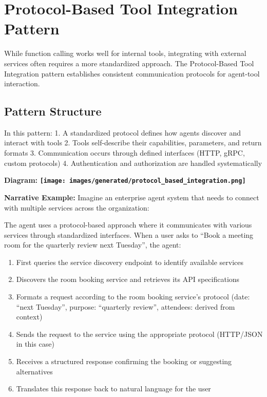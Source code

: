 \documentclass[11pt,oneside]{book}
\providecommand{\pandocbounded}[1]{\textbf{#1}}
\providecommand{\tightlist}{%
  \setlength{\itemsep}{0pt}\setlength{\parskip}{0pt}}
\begin{document}
\section{Protocol-Based Tool Integration
Pattern}\label{protocol-based-tool-integration-pattern}

While function calling works well for internal tools, integrating with
external services often requires a more standardized approach. The
Protocol-Based Tool Integration pattern establishes consistent
communication protocols for agent-tool interaction.

\subsection{Pattern Structure}\label{pattern-structure-2}

In this pattern: 1. A standardized protocol defines how agents discover
and interact with tools 2. Tools self-describe their capabilities,
parameters, and return formats 3. Communication occurs through defined
interfaces (HTTP, gRPC, custom protocols) 4. Authentication and
authorization are handled systematically

\textbf{Diagram:}
\pandocbounded{\texttt{[image: images/generated/protocol\_based\_integration.png]}}

\textbf{Narrative Example:} Imagine an enterprise agent system that
needs to connect with multiple services across the organization:

The agent uses a protocol-based approach where it communicates with
various services through standardized interfaces. When a user asks to
``Book a meeting room for the quarterly review next Tuesday'', the
agent:

\begin{enumerate}
\def\labelenumi{\arabic{enumi}.}
\tightlist
\item
  First queries the service discovery endpoint to identify available
  services
\item
  Discovers the room booking service and retrieves its API
  specifications
\item
  Formats a request according to the room booking service's protocol
  (date: ``next Tuesday'', purpose: ``quarterly review'', attendees:
  derived from context)
\item
  Sends the request to the service using the appropriate protocol
  (HTTP/JSON in this case)
\item
  Receives a structured response confirming the booking or suggesting
  alternatives
\item
  Translates this response back to natural language for the user
\end{enumerate}
\end{document}
